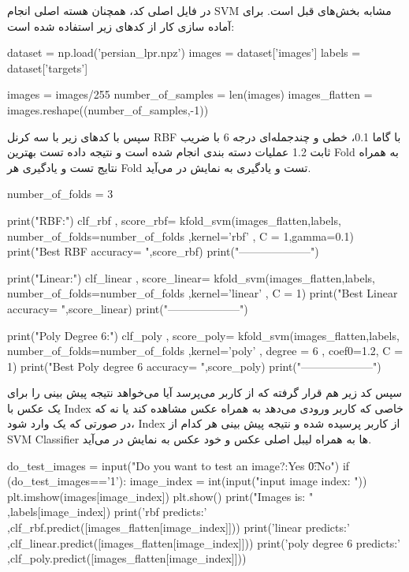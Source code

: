 \documentclass[12pt,titlepage,a4page , tikz , multi,table , svgnames,xcdraw]{article}
\begin{document}
در فایل اصلی کد، همچنان هسته اصلی انجام SVM مشابه بخش‌های قبل است. برای آماده سازی کار از کدهای زیر استفاده شده است:


\begin{latin}
\begin{python}[language=Python]
dataset = np.load('persian_lpr.npz')
images = dataset['images']
labels = dataset['targets']

images = images/255
number_of_samples = len(images)
images_flatten = images.reshape((number_of_samples,-1))

\end{python}

\end{latin}

سپس با کدهای زیر با سه کرنل RBF با گاما 0.1، خطی و چندجمله‌ای درجه 6 با ضریب ثابت 1.2 عملیات دسته بندی انجام شده است و نتیجه داده تست بهترین Fold به همراه نتایج تست و یادگیری هر Fold تست  و یادگیری به نمایش در می‌آید.



\begin{latin}
\begin{python}[language=Python]
number_of_folds = 3

print("RBF:")
clf_rbf , score_rbf= kfold_svm(images_flatten,labels,
number_of_folds=number_of_folds ,kernel='rbf' , C = 1,gamma=0.1)
print("Best RBF accuracy= ",score_rbf)
print("--------------------")


print("Linear:")
clf_linear , score_linear= kfold_svm(images_flatten,labels,
number_of_folds=number_of_folds ,kernel='linear' , C = 1)
print("Best Linear accuracy= ",score_linear)
print("--------------------")

print("Poly Degree 6:")
clf_poly , score_poly= kfold_svm(images_flatten,labels,
number_of_folds=number_of_folds ,kernel='poly' ,
degree = 6 , coef0=1.2, C = 1)
print("Best Poly degree 6 accuracy= ",score_poly)
print("--------------------")

\end{python}

\end{latin}


سپس کد زیر هم قرار گرفته که از کاربر می‌پرسد آیا می‌خواهد نتیجه پیش بینی را برای یک عکس با Index خاصی که کاربر ورودی می‌دهد به همراه عکس مشاهده کند یا نه که در صورتی که یک وارد شود، Index از کاربر پرسیده شده و نتیجه پیش بینی هر کدام از SVM Classifier ها به همراه لیبل اصلی عکس و خود عکس به نمایش در می‌آید.


\begin{latin}
\begin{python}[language=Python]
do_test_images = input("Do you want to test an image?:Yes \t 0:No\n")
if (do_test_images=='1'):
    image_index = int(input("input image index: "))
    plt.imshow(images[image_index])
    plt.show()
    print("Images is: " ,labels[image_index])
    print('rbf predicts:'
     ,clf_rbf.predict([images_flatten[image_index]]))
    print('linear predicts:'
     ,clf_linear.predict([images_flatten[image_index]]))
    print('poly degree 6 predicts:' 
    ,clf_poly.predict([images_flatten[image_index]]))
\end{python}

\end{latin}
\end{document}
